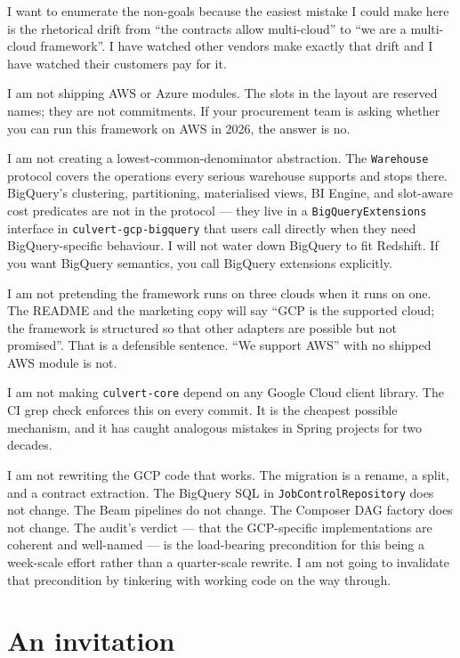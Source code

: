 \documentclass[
  11pt,
  british,
  oneside]{book}
\begin{document}
I want to enumerate the non-goals because the easiest
mistake I could make here is the rhetorical drift from ``the contracts
allow multi-cloud'' to ``we are a multi-cloud framework''. I have
watched other vendors make exactly that drift and I have watched their
customers pay for it.

I am not shipping AWS or Azure modules. The slots in the layout are
reserved names; they are not commitments. If your procurement team is
asking whether you can run this framework on AWS in 2026, the answer is
no.

I am not creating a lowest-common-denominator abstraction. The
\texttt{Warehouse} protocol covers the operations every serious
warehouse supports and stops there. BigQuery's clustering, partitioning,
materialised views, BI Engine, and slot-aware cost predicates are not in
the protocol --- they live in a \texttt{BigQueryExtensions} interface in
\texttt{culvert-gcp-bigquery} that users call directly when they need
BigQuery-specific behaviour. I will not water down BigQuery to fit
Redshift. If you want BigQuery semantics, you call BigQuery extensions
explicitly.

I am not pretending the framework runs on three clouds when it runs on
one. The README and the marketing copy will say ``GCP is the supported
cloud; the framework is structured so that other adapters are possible
but not promised''. That is a defensible sentence. ``We support AWS''
with no shipped AWS module is not.

I am not making \texttt{culvert-core} depend on any Google Cloud client
library. The CI grep check enforces this on every commit. It is the
cheapest possible mechanism, and it has caught analogous mistakes in
Spring projects for two decades.

I am not rewriting the GCP code that works. The migration is a rename, a
split, and a contract extraction. The BigQuery SQL in
\texttt{JobControlRepository} does not change. The Beam pipelines do not
change. The Composer DAG factory does not change. The audit's verdict
--- that the GCP-specific implementations are coherent and well-named
--- is the load-bearing precondition for this being a week-scale effort
rather than a quarter-scale rewrite. I am not going to invalidate that
precondition by tinkering with working code on the way through.

\hypertarget{an-invitation}{%
\section{An invitation}\label{an-invitation}}
\end{document}
